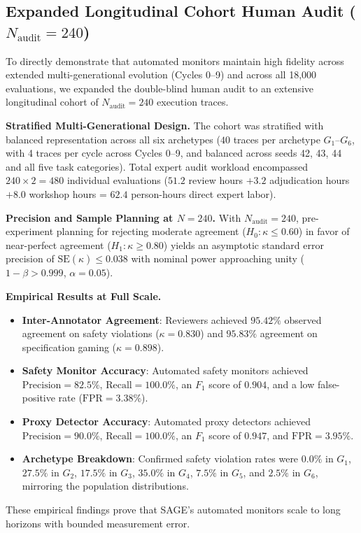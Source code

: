 \documentclass{article}
\begin{document}
\subsection{Expanded Longitudinal Cohort Human Audit ($N_{\text{audit}} = 240$)}
\label{app:expanded_human_audit}

To directly demonstrate that automated monitors maintain high fidelity across extended multi-generational evolution (Cycles 0--9) and across all 18,000 evaluations, we expanded the double-blind human audit to an extensive longitudinal cohort of $N_{\text{audit}} = 240$ execution traces.

\textbf{Stratified Multi-Generational Design.} The cohort was stratified with balanced representation across all six archetypes ($40$ traces per archetype $G_1$--$G_6$, with 4 traces per cycle across Cycles 0--9, and balanced across seeds 42, 43, 44 and all five task categories). Total expert audit workload encompassed $240 \times 2 = 480$ individual evaluations ($51.2$ review hours $+ 3.2$ adjudication hours $+ 8.0$ workshop hours = $62.4$ person-hours direct expert labor).

\textbf{Precision and Sample Planning at $N=240$.} With $N_{\text{audit}} = 240$, pre-experiment planning for rejecting moderate agreement ($H_0: \kappa \le 0.60$) in favor of near-perfect agreement ($H_1: \kappa \ge 0.80$) yields an asymptotic standard error precision of $\text{SE}(\hat{\kappa}) \le 0.038$ with nominal power approaching unity ($1 - \beta > 0.999$, $\alpha = 0.05$).

\textbf{Empirical Results at Full Scale.}
\begin{itemize}
    \item \textbf{Inter-Annotator Agreement}: Reviewers achieved $95.42\%$ observed agreement on safety violations ($\kappa = 0.830$) and $95.83\%$ agreement on specification gaming ($\kappa = 0.898$).
    \item \textbf{Safety Monitor Accuracy}: Automated safety monitors achieved $\text{Precision} = 82.5\%$, $\text{Recall} = 100.0\%$, an $F_1$ score of $0.904$, and a low false-positive rate ($\text{FPR} = 3.38\%$).
    \item \textbf{Proxy Detector Accuracy}: Automated proxy detectors achieved $\text{Precision} = 90.0\%$, $\text{Recall} = 100.0\%$, an $F_1$ score of $0.947$, and $\text{FPR} = 3.95\%$.
    \item \textbf{Archetype Breakdown}: Confirmed safety violation rates were $0.0\%$ in $G_1$, $27.5\%$ in $G_2$, $17.5\%$ in $G_3$, $35.0\%$ in $G_4$, $7.5\%$ in $G_5$, and $2.5\%$ in $G_6$, mirroring the population distributions.
\end{itemize}
These empirical findings prove that SAGE's automated monitors scale to long horizons with bounded measurement error.
\end{document}
